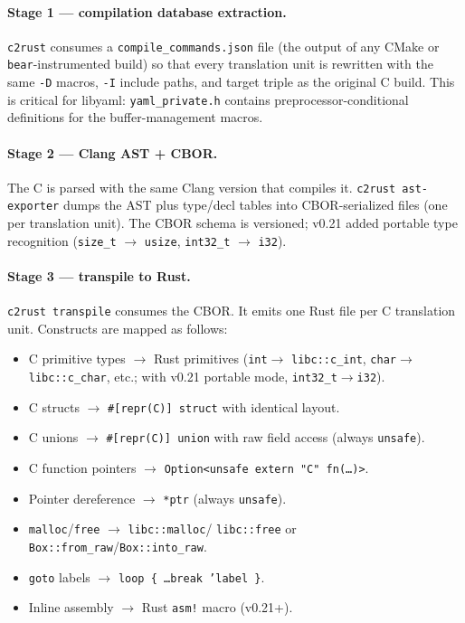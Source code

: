 \documentclass[12pt]{article}
\theoremstyle{definition}
\theoremstyle{remark}
\begin{document}
\paragraph{Stage 1 --- compilation database extraction.}
\texttt{c2rust} consumes a \texttt{compile\_commands.json} file (the
output of any CMake or \texttt{bear}-instrumented build) so that every
translation unit is rewritten with the same \texttt{-D} macros,
\texttt{-I} include paths, and target triple as the original C build.
This is critical for libyaml: \texttt{yaml\_private.h} contains
preprocessor-conditional definitions for the buffer-management macros.

\paragraph{Stage 2 --- Clang AST + CBOR.}
The C is parsed with the same Clang version that compiles it.
\texttt{c2rust ast-exporter} dumps the AST plus type/decl tables into
CBOR-serialized files (one per translation unit). The CBOR schema is
versioned; v0.21 added portable type recognition (\texttt{size\_t} $\to$
\texttt{usize}, \texttt{int32\_t} $\to$ \texttt{i32}).

\paragraph{Stage 3 --- transpile to Rust.}
\texttt{c2rust transpile} consumes the CBOR. It emits one Rust file per
C translation unit. Constructs are mapped as follows:
\begin{itemize}
\item C primitive types $\to$ Rust primitives (\texttt{int}$\to$
  \texttt{libc::c\_int}, \texttt{char}$\to$\texttt{libc::c\_char}, etc.;
  with v0.21 portable mode, \texttt{int32\_t}$\to$\texttt{i32}).
\item C structs $\to$ \texttt{\#[repr(C)] struct} with identical
  layout.
\item C unions $\to$ \texttt{\#[repr(C)] union} with raw field access
  (always \texttt{unsafe}).
\item C function pointers $\to$ \texttt{Option<unsafe extern "C" fn(\ldots)>}.
\item Pointer dereference $\to$ \texttt{*ptr} (always \texttt{unsafe}).
\item \texttt{malloc}/\texttt{free} $\to$ \texttt{libc::malloc}/
  \texttt{libc::free} or \texttt{Box::from\_raw}/\texttt{Box::into\_raw}.
\item \texttt{goto} labels $\to$ \texttt{loop \{ \dots \texttt{break} 'label \}}.
\item Inline assembly $\to$ Rust \texttt{asm!} macro (v0.21+).
\end{itemize}
\end{document}
